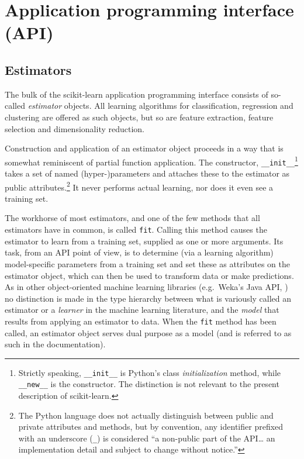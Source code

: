 \section{Application programming interface (API)}

\subsection{Estimators}


The bulk of the scikit-learn application programming interface
consists of so-called \textit{estimator} objects.
All learning algorithms for classification, regression and clustering
are offered as such objects,
but so are feature extraction, feature selection and dimensionality reduction.

Construction and application of an estimator object
proceeds in a way that is somewhat reminiscent of partial function application.
The constructor, \texttt{\_\_init\_\_}\footnote{
  Strictly speaking, \texttt{\_\_init\_\_} is Python's
  class \textit{initialization} method,
  while \texttt{\_\_new\_\_} is the constructor.
  The distinction is not relevant to the present description of scikit-learn.}
takes a set of named (hyper-)parameters
and attaches these to the estimator as public attributes.\footnote{
  The Python language does not actually distinguish between public and private
  attributes and methods,
  but by convention, any identifier prefixed with an underscore (\texttt{\_})
  is considered ``a non-public part of the API\ldots
  an implementation detail and subject to change without notice.''
  }
It never performs actual learning, nor does it even see a training set.

The workhorse of most estimators, and one of the few methods
that all estimators have in common, is called \texttt{fit}.
Calling this method causes the estimator to learn from a training set,
supplied as one or more arguments.
Its task, from an API point of view,
is to determine (via a learning algorithm) model-specific parameters
from a training set and set these as attributes on the estimator object,
which can then be used to transform data or make predictions.
As in other object-oriented machine learning libraries
(e.g.\ Weka's Java API, \citealp{hall2009weka})
no distinction is made in the type hierarchy
between what is variously called an estimator or a \textit{learner}
in the machine learning literature,
and the \textit{model} that results from applying an estimator to data.
When the \texttt{fit} method has been called,
an estimator object serves dual purpose as a model
(and is referred to as such in the documentation).

